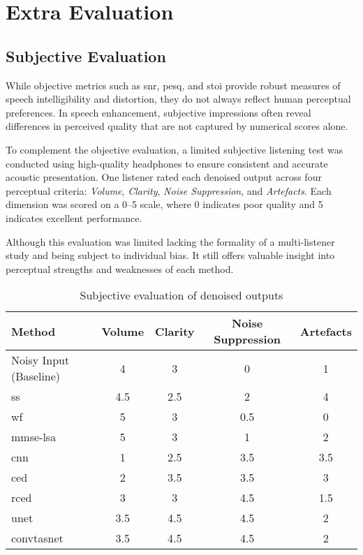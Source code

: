 \graphicspath{{content/appendices/figures}}
\chapter{Extra Evaluation}
\label{appendix:extra_evaluation}

\section{Subjective Evaluation}
\label{sec:subjective_evaluation}

While objective metrics such as \gls{snr}, \gls{pesq}, and \gls{stoi} provide robust measures of speech intelligibility and distortion, they do not always reflect human perceptual preferences. In speech enhancement, subjective impressions often reveal differences in perceived quality that are not captured by numerical scores alone.

To complement the objective evaluation, a limited subjective listening test was conducted using high-quality headphones to ensure consistent and accurate acoustic presentation. One listener rated each denoised output across four perceptual criteria: \textit{Volume}, \textit{Clarity}, \textit{Noise Suppression}, and \textit{Artefacts}. Each dimension was scored on a 0--5 scale, where 0 indicates poor quality and 5 indicates excellent performance.

Although this evaluation was limited lacking the formality of a multi-listener study and being subject to individual bias. It still offers valuable insight into perceptual strengths and weaknesses of each method.

\begin{table}[H]
\centering
\caption{Subjective evaluation of denoised outputs}
\label{tab:subjective_scores}
\begin{tabular}{|l|c|c|c|c|}
\hline
\textbf{Method} & \textbf{Volume} & \textbf{Clarity} & \textbf{Noise Suppression} & \textbf{Artefacts} \\
\hline
Noisy Input (Baseline) & 4 & 3 & 0 & 1 \\
\gls{ss}               & 4.5 & 2.5 & 2 & 4 \\
\gls{wf}               & 5 & 3 & 0.5 & 0 \\
\gls{mmse-lsa}         & 5 & 3 & 1 & 2 \\
\gls{cnn}              & 1 & 2.5 & 3.5 & 3.5 \\
\gls{ced}              & 2 & 3.5 & 3.5 & 3 \\
\gls{rced}             & 3 & 3 & 4.5 & 1.5 \\
\gls{unet}             & 3.5 & 4.5 & 4.5 & 2 \\
\gls{convtasnet}       & 3.5 & 4.5 & 4.5 & 2 \\
\hline
\end{tabular}
\end{table}

